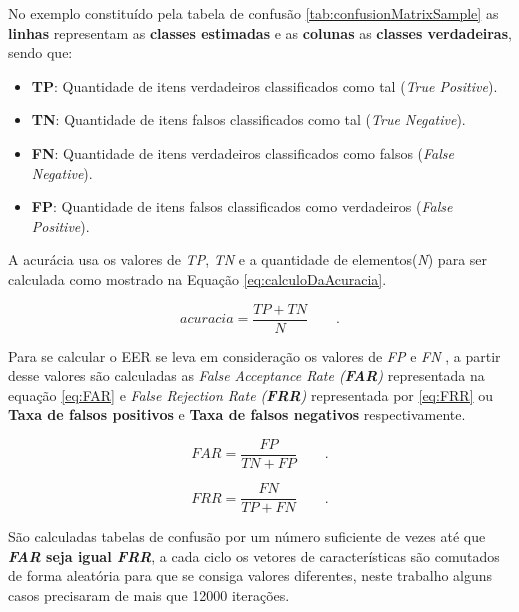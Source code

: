 		\par No exemplo constituído pela tabela de confusão \ref{tab:confusionMatrixSample} as \textbf{linhas} representam as \textbf{classes estimadas} e as \textbf{colunas} as \textbf{classes verdadeiras}, sendo que:
		\begin{itemize}
			\item \textbf{TP}: Quantidade de itens verdadeiros classificados como tal (\textit{True Positive}).
			\item \textbf{TN}: Quantidade de itens falsos classificados como tal (\textit{True Negative}).
			\item \textbf{FN}: Quantidade de itens verdadeiros classificados como falsos (\textit{False Negative}).
			\item \textbf{FP}: Quantidade de itens falsos classificados como verdadeiros (\textit{False Positive}).
		\end{itemize} 
		
		
		\par A acurácia usa os valores de \textit{TP}, \textit{TN} e a quantidade de elementos(\textit{N}) para ser calculada como mostrado na Equação \ref{eq:calculoDaAcuracia}.
		
		\begin{equation}
			acuracia = \dfrac{TP + TN}{N} \qquad.
			\label{eq:calculoDaAcuracia}
		\end{equation}

		\par Para se calcular o EER se leva em consideração os valores de \textit{FP} e \textit{FN} \cite{ghazali2018recent}, a partir desse valores são calculadas as \textit{False Acceptance Rate (\textbf{FAR})} representada na equação \ref{eq:FAR} e \textit{False Rejection Rate (\textbf{FRR})} representada por \ref{eq:FRR} ou \textbf{Taxa de falsos positivos} e \textbf{Taxa de falsos negativos} respectivamente.
		
		\begin{equation}
			FAR=\dfrac{FP}{TN+FP} \qquad.
			\label{eq:FAR}
		\end{equation}
		
		\begin{equation}
			FRR=\dfrac{FN}{TP+FN} \qquad.
			\label{eq:FRR}
		\end{equation}
				
		\par São calculadas tabelas de confusão por um número suficiente de vezes até que \textbf{\textit{FAR} seja igual \textit{FRR}}, a cada ciclo os vetores de características são comutados de forma aleatória para que se consiga valores diferentes, neste trabalho alguns casos precisaram de mais que 12000 iterações.
		
